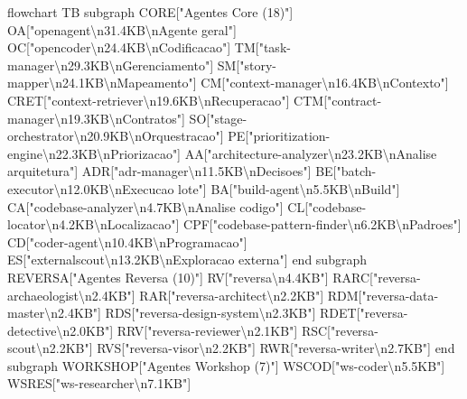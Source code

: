 \documentclass[
  12pt,
]{article}
\newenvironment{Shaded}{}{}
\newcommand{\NormalTok}[1]{#1}
\begin{document}
\begin{Shaded}
\begin{Highlighting}[]
\NormalTok{flowchart TB}
\NormalTok{subgraph CORE["Agentes Core (18)"]}
\NormalTok{OA["openagent\textbackslash{}n31.4KB\textbackslash{}nAgente geral"]}
\NormalTok{OC["opencoder\textbackslash{}n24.4KB\textbackslash{}nCodificacao"]}
\NormalTok{TM["task{-}manager\textbackslash{}n29.3KB\textbackslash{}nGerenciamento"]}
\NormalTok{SM["story{-}mapper\textbackslash{}n24.1KB\textbackslash{}nMapeamento"]}
\NormalTok{CM["context{-}manager\textbackslash{}n16.4KB\textbackslash{}nContexto"]}
\NormalTok{CRET["context{-}retriever\textbackslash{}n19.6KB\textbackslash{}nRecuperacao"]}
\NormalTok{CTM["contract{-}manager\textbackslash{}n19.3KB\textbackslash{}nContratos"]}
\NormalTok{SO["stage{-}orchestrator\textbackslash{}n20.9KB\textbackslash{}nOrquestracao"]}
\NormalTok{PE["prioritization{-}engine\textbackslash{}n22.3KB\textbackslash{}nPriorizacao"]}
\NormalTok{AA["architecture{-}analyzer\textbackslash{}n23.2KB\textbackslash{}nAnalise arquitetura"]}
\NormalTok{ADR["adr{-}manager\textbackslash{}n11.5KB\textbackslash{}nDecisoes"]}
\NormalTok{BE["batch{-}executor\textbackslash{}n12.0KB\textbackslash{}nExecucao lote"]}
\NormalTok{BA["build{-}agent\textbackslash{}n5.5KB\textbackslash{}nBuild"]}
\NormalTok{CA["codebase{-}analyzer\textbackslash{}n4.7KB\textbackslash{}nAnalise codigo"]}
\NormalTok{CL["codebase{-}locator\textbackslash{}n4.2KB\textbackslash{}nLocalizacao"]}
\NormalTok{CPF["codebase{-}pattern{-}finder\textbackslash{}n6.2KB\textbackslash{}nPadroes"]}
\NormalTok{CD["coder{-}agent\textbackslash{}n10.4KB\textbackslash{}nProgramacao"]}
\NormalTok{ES["externalscout\textbackslash{}n13.2KB\textbackslash{}nExploracao externa"]}
\NormalTok{end}
\NormalTok{subgraph REVERSA["Agentes Reversa (10)"]}
\NormalTok{RV["reversa\textbackslash{}n4.4KB"]}
\NormalTok{RARC["reversa{-}archaeologist\textbackslash{}n2.4KB"]}
\NormalTok{RAR["reversa{-}architect\textbackslash{}n2.2KB"]}
\NormalTok{RDM["reversa{-}data{-}master\textbackslash{}n2.4KB"]}
\NormalTok{RDS["reversa{-}design{-}system\textbackslash{}n2.3KB"]}
\NormalTok{RDET["reversa{-}detective\textbackslash{}n2.0KB"]}
\NormalTok{RRV["reversa{-}reviewer\textbackslash{}n2.1KB"]}
\NormalTok{RSC["reversa{-}scout\textbackslash{}n2.2KB"]}
\NormalTok{RVS["reversa{-}visor\textbackslash{}n2.2KB"]}
\NormalTok{RWR["reversa{-}writer\textbackslash{}n2.7KB"]}
\NormalTok{end}
\NormalTok{subgraph WORKSHOP["Agentes Workshop (7)"]}
\NormalTok{WSCOD["ws{-}coder\textbackslash{}n5.5KB"]}
\NormalTok{WSRES["ws{-}researcher\textbackslash{}n7.1KB"]}

\end{Highlighting}
\end{Shaded}
\end{document}
